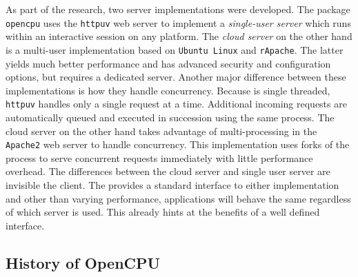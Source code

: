 As part of the research, two \OpenCPU server implementations were developed. The \R package \texttt{opencpu} uses the \texttt{httpuv} web server \citep{httpuv} to implement a \emph{single-user server} which runs within an interactive \R session on any platform. The \emph{cloud server} on the other hand is a multi-user implementation based on \texttt{Ubuntu Linux} and \texttt{rApache}. The latter yields much better performance and has advanced security and configuration options, but requires a dedicated \Linux server. Another major difference between these implementations is how they handle concurrency. Because \R is single threaded, \texttt{httpuv} handles only a single request at a time. Additional incoming requests are automatically queued and executed in succession using the same process. The cloud server on the other hand takes advantage of multi-processing in the \texttt{Apache2} web server to handle concurrency. This implementation uses forks of the \R process to serve concurrent requests immediately with little performance overhead. The differences between the cloud server and single user server are invisible the client. The \API provides a standard interface to either implementation and other than varying performance, applications will behave the same regardless of which server is used. This already hints at the benefits of a well defined interface.


\subsection{History of OpenCPU}



